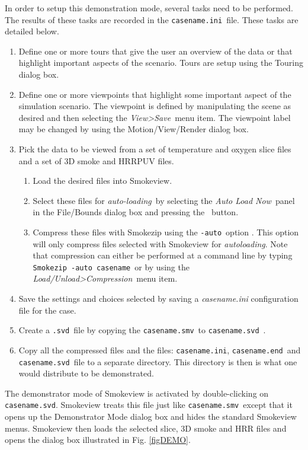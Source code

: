 \documentclass[11pt,twoside]{book}
\newcommand{\frameit}[1]{\fbox{\tt #1}}
\begin{document}
In order to setup this demonstration mode, several tasks need to be performed.
The results of these tasks are
recorded in the {\tt casename.ini}\ file.
These tasks are detailed below.

\begin{enumerate}
  \item Define one or more tours that give the user an overview of the data or that highlight important
  aspects of the scenario.   Tours are setup using the Touring dialog box.
  \item Define one or more viewpoints that highlight some important
  aspect of the simulation scenario.  The viewpoint is defined by manipulating the scene
  as desired and then selecting the {\em View>Save}\ menu item.  The viewpoint label may
  be changed by using the Motion/View/Render dialog box.
  \item Pick the data to be viewed from a set of temperature and oxygen slice files
  and a set of 3D smoke and HRRPUV files.
  \begin{enumerate}
    \item Load the desired files into Smokeview.
    \item Select these files for {\em auto-loading}\ by selecting the {\em Auto Load Now}\ panel
    in the File/Bounds dialog box and pressing the
    \frameit{Save Auto Load File List}\ button.
    \item Compress these files with Smokezip using the {\tt -auto}\ option .
    This option will only compress files selected with Smokeview for {\em autoloading}.
    Note that compression can either be performed at a command line by typing
    {\tt Smokezip -auto casename}\ or by using the {\em Load/Unload>Compression}\ menu item.
      \end{enumerate}
  \item Save the settings and choices selected by saving a {\em casename.ini}
  configuration file for the case.
  \item Create a {\tt .svd}\ file by copying the {\tt casename.smv}\ to {\tt casename.svd}\ .
  \item Copy all the compressed files and the files: {\tt casename.ini}, {\tt casename.end}\ and {\tt casename.svd}\ file to a separate directory.  This directory is then is what one would distribute to be demonstrated.
\end{enumerate}

The demonstrator mode of Smokeview is activated by double-clicking on {\tt casename.svd}.
Smokeview treats this file just like {\tt casename.smv}\ except that it opens up
the Demonstrator Mode dialog box and hides the standard Smokeview menus.
Smokeview then
loads the selected slice, 3D smoke and HRR files and opens the dialog box illustrated in
Fig. \ref{figDEMO}.
\end{document}
